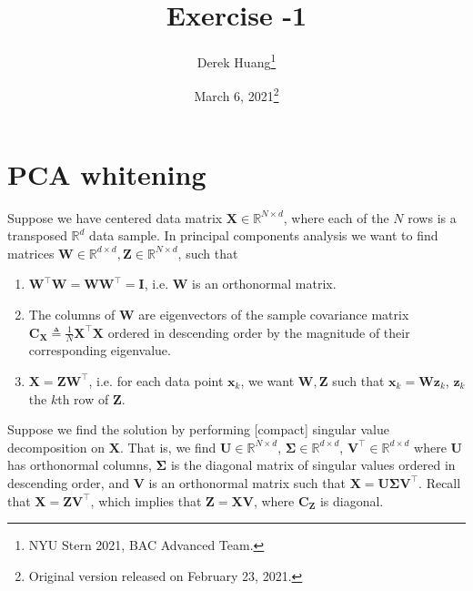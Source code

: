 \documentclass{article}
\title{Exercise -1}
\author{Derek Huang\thanks{NYU Stern 2021, BAC Advanced Team.}}
\date{March 6, 2021\thanks{Original version released on February 23, 2021.}}
\numberwithin{equation}{section}
\begin{document}
\maketitle
\thispagestyle{fancy}

\vspace{-20 pt}

\section{PCA whitening}

Suppose we have centered data matrix $ \mathbf{X} \in
\mathbb{R}^{N \times d} $, where each of the $ N $ rows is a transposed
$ \mathbb{R}^d $ data sample. In principal components analysis we want to find
matrices $ \mathbf{W} \in \mathbb{R}^{d \times d},
\mathbf{Z} \in \mathbb{R}^{N \times d} $, such that
\begin{enumerate}
    \item
    $ \mathbf{W}^\top\mathbf{W} = \mathbf{WW}^\top = \mathbf{I} $, i.e.
    $ \mathbf{W} $ is an orthonormal matrix.

    \item
    The columns of $ \mathbf{W} $ are eigenvectors of the sample covariance
    matrix $ \mathbf{C}_\mathbf{X} \triangleq \frac{1}{N}\mathbf{X}^\top\mathbf{X} $
    ordered in descending order by the magnitude of their corresponding
    eigenvalue.

    \item
    $ \mathbf{X} = \mathbf{ZW}^\top $, i.e. for each data point
    $ \mathbf{x}_k $, we want $ \mathbf{W}, \mathbf{Z} $ such that
    $ \mathbf{x}_k = \mathbf{Wz}_k $, $ \mathbf{z}_k $ the $ k $th row of
    $ \mathbf{Z} $.
\end{enumerate}

Suppose we find the solution by performing [compact] singular value
decomposition on $ \mathbf{X} $. That is, we find $ \mathbf{U} \in
\mathbb{R}^{N \times d} $, $ \mathbf{\Sigma} \in \mathbb{R}^{d \times d} $,
$ \mathbf{V}^\top \in \mathbb{R}^{d \times d} $ where $ \mathbf{U} $ has
orthonormal columns, $ \mathbf{\Sigma} $ is the diagonal matrix of singular
values\footnotemark{} ordered in descending order, and $ \mathbf{V} $ is an orthonormal matrix
such that $ \mathbf{X} = \mathbf{U\Sigma V}^\top $. Recall that
$ \mathbf{X} = \mathbf{ZV}^\top $, which implies that
$ \mathbf{Z} = \mathbf{XV} $, where $ \mathbf{C}_\mathbf{Z} $ is diagonal.
\end{document}
